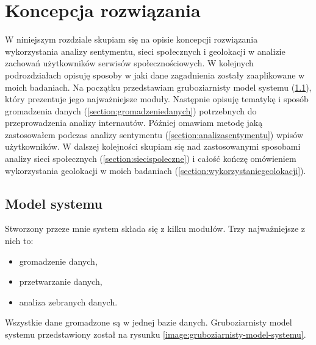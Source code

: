 \chapter{Koncepcja rozwiązania}

W niniejszym rozdziale skupiam się na opisie koncepcji rozwiązania wykorzystania
analizy sentymentu, sieci społecznych i geolokacji w analizie zachowań
użytkowników serwisów społecznościowych. W kolejnych podrozdziałach opisuję
sposoby w jaki dane zagadnienia zostały zaaplikowane w moich badaniach.
Na początku przedstawiam gruboziarnisty model systemu (\ref{section:modelsystemu}),
który prezentuje jego najważniejsze moduły. Następnie opisuję tematykę
i sposób gromadzenia danych (\ref{section:gromadzeniedanych}) potrzebnych do 
przeprowadzenia analizy internautów. Później omawiam metodę jaką zastosowałem 
podczas analizy sentymentu (\ref{section:analizasentymentu}) wpisów użytkowników.
W dalszej kolejności skupiam się nad zastosowanymi
sposobami analizy sieci społecznych (\ref{section:siecispoleczne})
i całość kończę omówieniem wykorzystania geolokacji w moich badaniach 
(\ref{section:wykorzystaniegeolokacji}).








\section{Model systemu}
\label{section:modelsystemu}
Stworzony przeze mnie system składa się z kilku modułów. Trzy najważniejsze
z nich to:
\begin{itemize}
  \item gromadzenie danych,
  \item przetwarzanie danych,
  \item analiza zebranych danych.
\end{itemize}
Wszystkie dane gromadzone są w jednej bazie danych.
Gruboziarnisty model systemu przedstawiony został na rysunku 
\ref{image:gruboziarnisty-model-systemu}.
\clearpage

